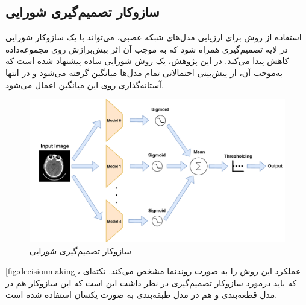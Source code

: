 \subsection{سازوکار تصمیم‌گیری شورایی}
\label{ch2-decision-policy}
استفاده از روش
برای ارزیابی مدل‌های شبکه‌ عصبی،‌ می‌تواند با یک سازوکار شورایی در لایه تصمیم‌گیری همراه شود که به موجب آن اثر بیش‌برازش روی مجموعه‌داده کاهش پیدا می‌کند. در این پژوهش،‌ یک روش شورایی ساده پیشنهاد شده است که به‌موجب آن، از پیش‌بینی احتمالاتی تمام مدل‌ها میانگین گرفته می‌شود و در انتها آستانه‌گذاری روی این میانگین اعمال می‌شود.


\begin{figure}[h]
\centering
\includegraphics[width=1.0\linewidth]{Images/Chapter2/decision_making.drawio}
\caption{سازوکار تصمیم‌گیری شورایی}
\label{fig:decisionmaking}
\end{figure}

\autoref{fig:decisionmaking}،
عملکرد این روش را به صورت روند‌نما مشخص می‌کند. نکته‌ای که باید درمورد سازوکار تصمیم‌گیری در نظر داشت این است که این سازوکار هم در مدل قطعه‌بندی و هم در مدل طبقه‌بندی به صورت یکسان استفاده شده است.

